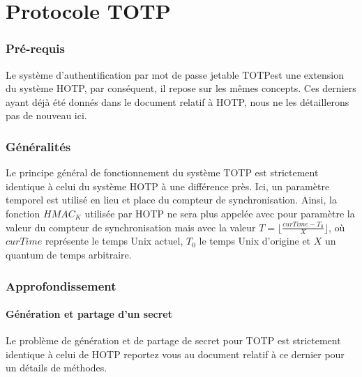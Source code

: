 \documentclass{../res/univ-projet}
\begin{document}
\setcounter{section}{0}
\part{Protocole TOTP}

\section{Pré-requis}
Le système d'authentification par mot de passe jetable \og{}TOTP\fg est une extension du système \og{}HOTP\fg{}, par conséquent, il repose sur les mêmes concepts. Ces 
derniers ayant déjà été donnés dans le document relatif à \og{}HOTP\fg{}, nous ne les détaillerons pas de nouveau ici.

\section{Généralités}
Le principe général de fonctionnement du système \og{}TOTP\fg{} est strictement identique à celui du système \og{}HOTP\fg{} à une différence près. Ici, un paramètre 
temporel est utilisé en lieu et place du compteur de synchronisation. Ainsi, la fonction $HMAC_K$ utilisée par \og{}HOTP\fg{} ne sera plus appelée avec pour paramètre la 
valeur du compteur de synchronisation mais avec la valeur $T = \lfloor{}\frac{curTime - T_0}{X}\rfloor{}$, où $curTime$ représente le temps Unix actuel, $T_0$ le temps Unix \og{}
d'origine\fg{} et $X$ un quantum de temps arbitraire.

\section{Approfondissement}
  \subsection{Génération et partage d'un secret}
    Le problème de génération et de partage de secret pour \og{}TOTP\fg{} est strictement identique à celui de \og{}HOTP\fg{} reportez vous au document relatif à ce 
    dernier pour un détails de méthodes.
    
\end{document}
